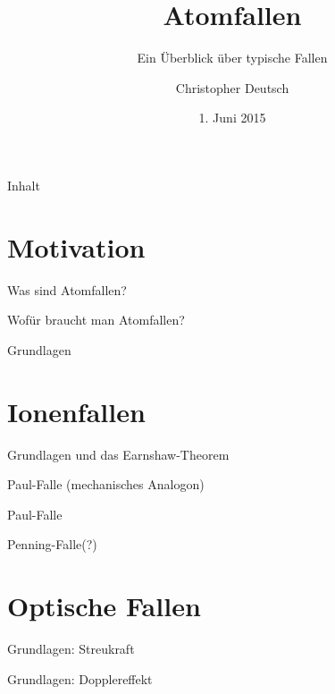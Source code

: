 \documentclass[12pt]{beamer}
\author[Christopher Deutsch]
{Christopher Deutsch}
\title
{Atomfallen}
\subtitle
{Ein Überblick über typische Fallen}
\institute[]
{Rheinische Friedrich-Wilhelms-Universität Bonn \\
Proseminar Präsentationstechnik SS15}
\date{1. Juni 2015}
\begin{document}
\maketitle

\begin{frame}{Inhalt}
	\tableofcontents
\end{frame}


\section{Motivation}

\begin{frame}{Was sind Atomfallen?}
\end{frame}

\begin{frame}{Wofür braucht man Atomfallen?}
\end{frame}

\begin{frame}{Grundlagen}
\end{frame}


\section{Ionenfallen}

\begin{frame}{Grundlagen und das Earnshaw-Theorem}
\end{frame}

\begin{frame}{Paul-Falle (mechanisches Analogon)}
\end{frame}

\begin{frame}{Paul-Falle}
\end{frame}

\begin{frame}{Penning-Falle(?)}
\end{frame}


\section{Optische Fallen}

\begin{frame}{Grundlagen: Streukraft}
\end{frame}

\begin{frame}{Grundlagen: Dopplereffekt}
\end{frame}
\end{document}
